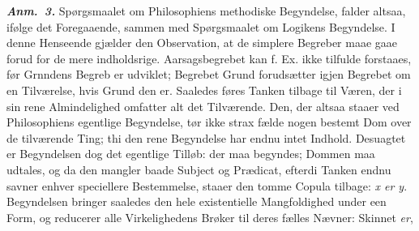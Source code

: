 \documentclass[12pt]{book}
\newcommand{\anm}[1]{\emph{\textbf{Anm.~#1.}}}
\newcommand{\opage}[1]{\marginnote{\footnotesize\textit{[#1]}}}
\begin{document}
\anm{3} Spørgsmaalet om Philosophiens methodiske Begyndelse, falder altsaa, ifølge det
Foregaaende, sammen med Spørgsmaalet om Logikens Begyndelse. I denne Henseende gjælder den
Observation, at de simplere Begreber maae gaae forud for de mere indholdsrige. Aarsagsbegrebet
kan f. Ex. ikke tilfulde forstaaes, før Grnndens Begreb er udviklet;
Begrebet Grund forudsætter igjen Begrebet om en Tilværelse, hvis Grund den er. Saaledes føres
Tanken tilbage til Væren, der i sin rene Almindelighed omfatter alt det Tilværende. Den, der
altsaa staaer ved Philosophiens egentlige Begyndelse, tør ikke strax fælde nogen bestemt Dom
over de tilværende Ting; thi den rene Begyndelse har endnu intet Indhold. Desuagtet er
Begyndelsen dog det egentlige
\opage{103} %
Tilløb: der maa begyndes; Dommen maa udtales, og da den mangler baade Subject og Prædicat,
efterdi Tanken endnu savner enhver speciellere Bestemmelse, staaer den tomme Copula tilbage:
\textit{x er y}. Begyndelsen bringer saaledes den hele existentielle Mangfoldighed under een
Form, og reducerer alle Virkelighedens Brøker til deres fælles Nævner: Skinnet \emph{er},
\end{document}

